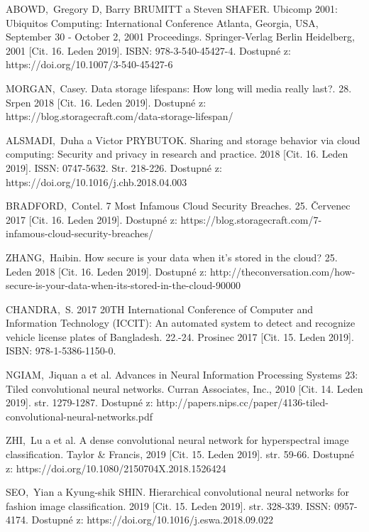 \documentclass[conference]{IEEEtran}
\begin{document}
\begin{thebibliography}{1}

ABOWD,~Gregory D, Barry BRUMITT a Steven SHAFER. Ubicomp 2001: Ubiquitos Computing: International Conference Atlanta, Georgia, USA, September 30 - October 2, 2001 Proceedings. Springer-Verlag Berlin Heidelberg, 2001 [Cit. 16. Leden 2019]. ISBN: 978-3-540-45427-4. Dostupné z: https://doi.org/10.1007/3-540-45427-6

MORGAN,~Casey. Data storage lifespans: How long will media really last?. 28. Srpen 2018 [Cit. 16. Leden 2019]. Dostupné z: https://blog.storagecraft.com/data-storage-lifespan/
	
ALSMADI,~Duha a Victor PRYBUTOK. Sharing and storage behavior via cloud computing: Security and privacy in research and practice. 2018 [Cit. 16. Leden 2019]. ISSN: 0747-5632. Str. 218-226. Dostupné z: https://doi.org/10.1016/j.chb.2018.04.003

BRADFORD,~Contel. 7 Most Infamous Cloud Security Breaches. 25. Červenec 2017 [Cit. 16. Leden 2019]. Dostupné z: https://blog.storagecraft.com/7-infamous-cloud-security-breaches/

ZHANG,~Haibin. How secure is your data when it’s stored in the cloud? 25. Leden 2018 [Cit. 16. Leden 2019]. Dostupné z: http://theconversation.com/how-secure-is-your-data-when-its-stored-in-the-cloud-90000

CHANDRA,~S. 2017 20TH International Conference of Computer and Information Technology (ICCIT): An automated system to detect and recognize vehicle license plates of Bangladesh. 22.-24. Prosinec 2017 [Cit. 15. Leden 2019]. ISBN: 978-1-5386-1150-0. 
	
NGIAM,~Jiquan a et al. Advances in Neural Information Processing Systems 23: Tiled convolutional neural networks. Curran Associates, Inc., 2010 [Cit. 14. Leden 2019]. str. 1279-1287. Dostupné z: http://papers.nips.cc/paper/4136-tiled-convolutional-neural-networks.pdf 

ZHI,~Lu a et al. A dense convolutional neural network for hyperspectral image classification. Taylor \& Francis, 2019 [Cit. 15. Leden 2019]. str. 59-66. Dostupné z: https://doi.org/10.1080/2150704X.2018.1526424 

SEO,~Yian a Kyung-shik SHIN. Hierarchical convolutional neural networks for fashion image classification. 2019 [Cit. 15. Leden 2019]. str. 328-339. ISSN: 0957-4174. Dostupné z: https://doi.org/10.1016/j.eswa.2018.09.022


\end{thebibliography}
\end{document}
